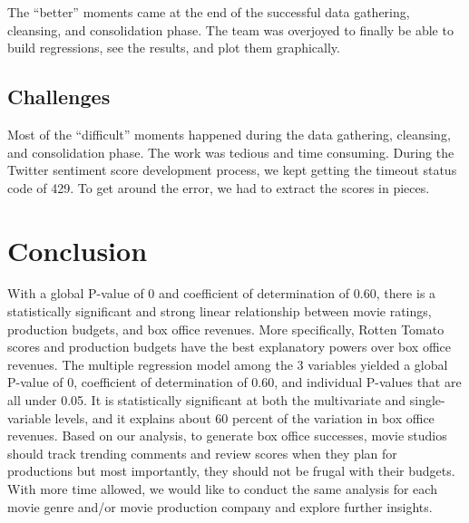 \documentclass{article}
\begin{document}
The “better” moments came at the end of the successful data gathering, cleansing, and consolidation phase.  The team was overjoyed to finally be able to build regressions, see the results, and plot them graphically.

\subsection{Challenges}

Most of the “difficult” moments happened during the data gathering, cleansing, and consolidation phase.  The work was tedious and time consuming.  During the Twitter sentiment score development process, we
kept getting the timeout status code of 429.  To get around the error, we had to extract the scores in pieces.    

\section{Conclusion}
With a global P-value of 0 and coefficient of determination of 0.60, there is a statistically significant and strong linear relationship between movie ratings, production budgets, and box office revenues.  More specifically, Rotten Tomato scores and production budgets have the best explanatory powers over box office revenues.  The multiple regression model among the 3 variables yielded a global P-value of 0, coefficient of determination of 0.60, and individual P-values that are all under 0.05.  
It is statistically significant at both the multivariate and single-variable levels, and it explains about 60 percent of the variation in box office revenues.  Based on our analysis, to generate box office successes, movie studios should track trending comments and review scores when they plan for productions but most importantly, they should not be frugal with their budgets.  With more time allowed, we would like to conduct the same analysis for each movie genre and/or movie production company and explore further insights.
\end{document}
